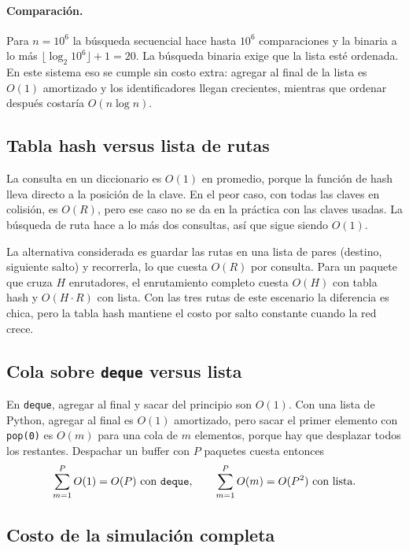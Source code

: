 \documentclass[11pt,a4paper]{article}
\begin{document}
\paragraph{Comparación.} Para $n = 10^6$ la búsqueda secuencial hace hasta
$10^6$ comparaciones y la binaria a lo más $\lfloor\log_2 10^6\rfloor + 1 = 20$.
La búsqueda binaria exige que la lista esté ordenada. En este sistema eso se
cumple sin costo extra: agregar al final de la lista es $O(1)$ amortizado y los
identificadores llegan crecientes, mientras que ordenar después costaría
$O(n \log n)$.

\subsection{Tabla hash versus lista de rutas}

La consulta en un diccionario es $O(1)$ en promedio, porque la función de hash
lleva directo a la posición de la clave. En el peor caso, con todas las claves
en colisión, es $O(R)$, pero ese caso no se da en la práctica con las claves
usadas. La búsqueda de ruta hace a lo más dos consultas, así que sigue siendo
$O(1)$.

La alternativa considerada es guardar las rutas en una lista de pares (destino,
siguiente salto) y recorrerla, lo que cuesta $O(R)$ por consulta. Para un
paquete que cruza $H$ enrutadores, el enrutamiento completo cuesta $O(H)$ con
tabla hash y $O(H \cdot R)$ con lista. Con las tres rutas de este escenario la
diferencia es chica, pero la tabla hash mantiene el costo por salto constante
cuando la red crece.

\subsection{Cola sobre \texttt{deque} versus lista}

En \texttt{deque}, agregar al final y sacar del principio son $O(1)$. Con una
lista de Python, agregar al final es $O(1)$ amortizado, pero sacar el primer
elemento con \texttt{pop(0)} es $O(m)$ para una cola de $m$ elementos, porque
hay que desplazar todos los restantes. Despachar un buffer con $P$ paquetes
cuesta entonces
\begin{equation}
\sum_{m=1}^{P} O(1) = O(P) \ \text{con \texttt{deque}}, \qquad
\sum_{m=1}^{P} O(m) = O(P^2) \ \text{con lista}.
\end{equation}

\subsection{Costo de la simulación completa}
\end{document}
